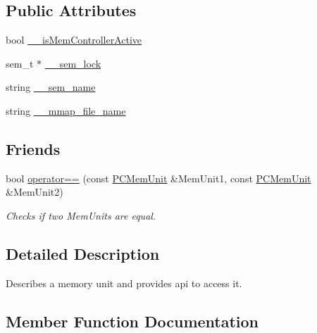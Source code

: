 \subsection*{Public Attributes}
\begin{DoxyCompactItemize}
\item 
bool \hyperlink{classpc__emulator_1_1PCMemUnit_abfb2a465dc75c79a392953fa9a143f28}{\+\_\+\+\_\+is\+Mem\+Controller\+Active}
\item 
sem\+\_\+t $\ast$ \hyperlink{classpc__emulator_1_1PCMemUnit_a77c288dd119a5ecd08bc793ed6a9b4cf}{\+\_\+\+\_\+sem\+\_\+lock}
\item 
string \hyperlink{classpc__emulator_1_1PCMemUnit_afa96f416f54665c3363aa4b110a6bcd9}{\+\_\+\+\_\+sem\+\_\+name}
\item 
string \hyperlink{classpc__emulator_1_1PCMemUnit_a0fcd708b1a7ee5ec5f6ba24d4b24a324}{\+\_\+\+\_\+mmap\+\_\+file\+\_\+name}
\end{DoxyCompactItemize}
\subsection*{Friends}
\begin{DoxyCompactItemize}
\item 
bool \hyperlink{classpc__emulator_1_1PCMemUnit_ab8a962fcf9bb78aad0b85e3ff2209096}{operator==} (const \hyperlink{classpc__emulator_1_1PCMemUnit}{P\+C\+Mem\+Unit} \&Mem\+Unit1, const \hyperlink{classpc__emulator_1_1PCMemUnit}{P\+C\+Mem\+Unit} \&Mem\+Unit2)
\begin{DoxyCompactList}\small\item\em Checks if two Mem\+Units are equal. \end{DoxyCompactList}\end{DoxyCompactItemize}


\subsection{Detailed Description}
Describes a memory unit and provides api to access it. 

\subsection{Member Function Documentation}
